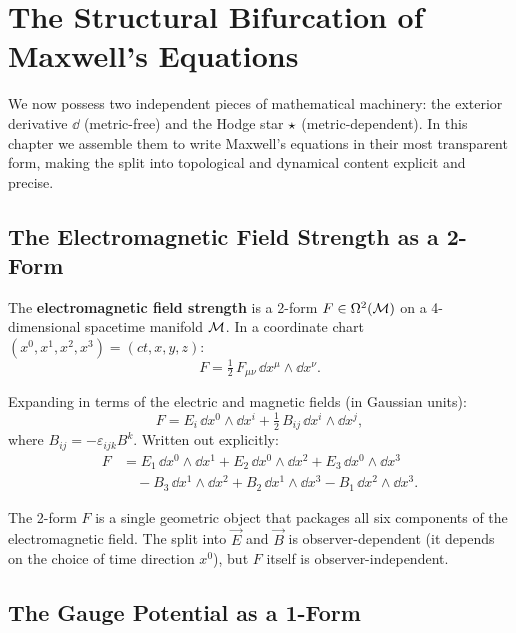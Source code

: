 \chapter{The Structural Bifurcation of Maxwell's Equations}

We now possess two independent pieces of mathematical machinery: the exterior derivative $\dd$ (metric-free) and the Hodge star $\star$ (metric-dependent). In this chapter we assemble them to write Maxwell's equations in their most transparent form, making the split into topological and dynamical content explicit and precise.

\section{The Electromagnetic Field Strength as a 2-Form}

\begin{definition}
The \textbf{electromagnetic field strength} is a 2-form $F \in \Omega^2(\mathcal{M})$ on a 4-dimensional spacetime manifold $\mathcal{M}$. In a coordinate chart $(x^0, x^1, x^2, x^3) = (ct, x, y, z)$:
\begin{equation}
F = \tfrac{1}{2}\,F_{\mu\nu}\,\dd x^\mu \wedge \dd x^\nu.
\end{equation}
\end{definition}

Expanding in terms of the electric and magnetic fields (in Gaussian units):
\begin{equation}
\boxed{F = E_i\,\dd x^0 \wedge \dd x^i + \tfrac{1}{2}\,B_{ij}\,\dd x^i \wedge \dd x^j,}
\end{equation}
where $B_{ij} = -\varepsilon_{ijk}B^k$. Written out explicitly:
\begin{align}
F &= E_1\,\dd x^0 \wedge \dd x^1 + E_2\,\dd x^0 \wedge \dd x^2 + E_3\,\dd x^0 \wedge \dd x^3 \nonumber\\
&\quad - B_3\,\dd x^1 \wedge \dd x^2 + B_2\,\dd x^1 \wedge \dd x^3 - B_1\,\dd x^2 \wedge \dd x^3.
\end{align}

The 2-form $F$ is a single geometric object that packages all six components of the electromagnetic field. The split into $\vec{E}$ and $\vec{B}$ is observer-dependent (it depends on the choice of time direction $x^0$), but $F$ itself is observer-independent.

\section{The Gauge Potential as a 1-Form}

